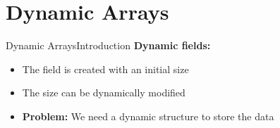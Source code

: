 \section{Dynamic Arrays}


\begin{frame}{Dynamic Arrays}{Introduction}
  \textbf{Dynamic fields:}
  \begin{itemize}
    \item
      The field is created with an initial size
    \item
      The size can be dynamically modified
    \item
      \textbf{Problem:}
      We need a dynamic structure to store the data
  \end{itemize}
\end{frame}








